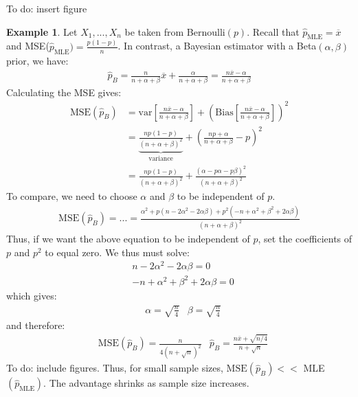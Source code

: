 \documentclass[11pt]{scrartcl}
\theoremstyle{definition}
\newtheorem{ex}{Example}
\theoremstyle{remark}
\begin{document}
{To do: insert figure

\begin{ex}
	Let $X_1, ..., X_n$ be taken from Bernoulli$(p)$. Recall that $\hat{p}_{\text{MLE}} = \overline{x}$ and MSE($\hat{p}_{\text{MLE}}) = \frac{p(1-p)}{n}$. In contrast, a Bayesian estimator with a Beta$(\alpha, \beta)$ prior, we have: 
	\begin{align*}
		\hat{p}_B = \frac{n}{n + \alpha + \beta} \overline{x} + \frac{\alpha}{n+ \alpha + \beta}	 = \frac{n \overline{x} - \alpha}{n + \alpha + \beta}	
	\end{align*}
	Calculating the MSE gives: 
	\begin{align*}
		\text{MSE}(\hat{p}_B) & = \text{var} \left[ 	\frac{n \overline{x} - \alpha}{n + \alpha + \beta}		\right] + \left( \text{Bias} \left[ \frac{n \overline{x} - \alpha}{n + \alpha + \beta}	 \right]  \right)^2 \\
		& = \underbrace{\frac{np(1-p)}{(n+ \alpha + \beta)^2}}_{\text{variance}} + \left( 	\frac{np + \alpha}{n + \alpha + \beta} - p	\right)^2 \\
		& = \frac{np(1-p)}{(n + \alpha + \beta)^2} + \frac{(\alpha - p \alpha - p \beta)^2}{(n + \alpha + \beta)^2}
	\end{align*}
	To compare, we need to choose $\alpha$ and $\beta$ to be independent of $p$. 
	\begin{align*}
		\text{MSE}(\hat{p}_B) = ... = \frac{\alpha^ 2 + p(n - 2 \alpha^2 - 2 \alpha \beta) + p^2(-n + \alpha^2 + \beta^2 + 2 \alpha \beta)}{(n+ \alpha + \beta)^2}
	\end{align*}
	Thus, if we want the above equation to be independent of $p$, set the coefficients of $p$ and $p^2$ to equal zero. We thus must solve: 
	\begin{align*}
			& n - 2 \alpha^2 - 2 \alpha \beta = 0 \\
			& -n + \alpha^2 + \beta^2 + 2 \alpha \beta = 0
	\end{align*}
	which gives: 
	\begin{align*}
		& \alpha = \sqrt{\frac{n}{4}} & \beta = \sqrt{\frac{n}{4}}
	\end{align*}
	and therefore: 
	\begin{align*}
		& \text{MSE}(\hat{p}_B) = \frac{n}{4(n+ \sqrt{n})^2 }	& \hat{p}_B = \frac{n \overline{x} + \sqrt{n / 4}}{n + \sqrt{n}}
	\end{align*}
	To do: include figures. 
	Thus, for small sample sizes, $\text{MSE}(\hat{p}_B )<< $ MLE$(\hat{p}_{\text{MLE}})$. The advantage shrinks as sample size increases. 
\end{ex}

}
\end{document}
